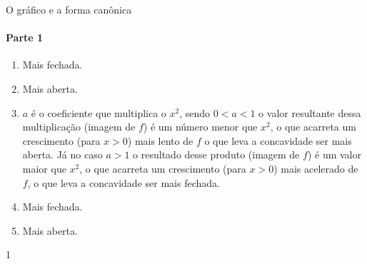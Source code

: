 \clearmargin
\begin{answer}{O gráfico e a forma canônica}
{
\paragraph{Parte 1}

\begin{enumerate}
\item {} 
Mais fechada.

\item {} 
Mais aberta.

\item {} 
\(a\) é o coeficiente que multiplica o \(x^2\), sendo \(0<a<1\) o valor resultante dessa multiplicação (imagem de \(f\)) é um número menor que \(x^2\), o que acarreta um crescimento (para \(x>0\)) mais lento de \(f\) o que leva a concavidade ser mais aberta. Já no caso \(a>1\) o resultado desse produto (imagem de \(f\)) é um valor maior que \(x^2\), o que acarreta um crescimento (para \(x>0\)) mais acelerado de \(f\), o que leva a concavidade ser mais fechada.

\item {} 
Mais fechada.

\item {} 
Mais aberta.
\end{enumerate}
}{1}
\end{answer}
\clearmargin
